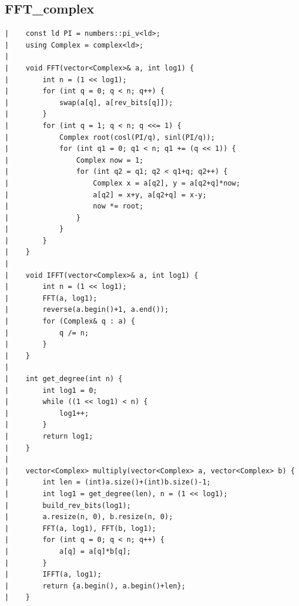 \documentclass[a4paper, 10pt]{article}
\begin{document}
\begin{center}
\section*{FFT\_complex}
\begin{verbatim}
|    const ld PI = numbers::pi_v<ld>;
|    using Complex = complex<ld>;
|    
|    void FFT(vector<Complex>& a, int log1) {
|        int n = (1 << log1);
|        for (int q = 0; q < n; q++) {
|            swap(a[q], a[rev_bits[q]]);
|        }
|        for (int q = 1; q < n; q <<= 1) {
|            Complex root(cosl(PI/q), sinl(PI/q));
|            for (int q1 = 0; q1 < n; q1 += (q << 1)) {
|                Complex now = 1;
|                for (int q2 = q1; q2 < q1+q; q2++) {
|                    Complex x = a[q2], y = a[q2+q]*now;
|                    a[q2] = x+y, a[q2+q] = x-y;
|                    now *= root;
|                }
|            }
|        }
|    }
|    
|    void IFFT(vector<Complex>& a, int log1) {
|        int n = (1 << log1);
|        FFT(a, log1);
|        reverse(a.begin()+1, a.end());
|        for (Complex& q : a) {
|            q /= n;
|        }
|    }
|    
|    int get_degree(int n) {
|        int log1 = 0;
|        while ((1 << log1) < n) {
|            log1++;
|        }
|        return log1;
|    }
|    
|    vector<Complex> multiply(vector<Complex> a, vector<Complex> b) {
|        int len = (int)a.size()+(int)b.size()-1;
|        int log1 = get_degree(len), n = (1 << log1);
|        build_rev_bits(log1);
|        a.resize(n, 0), b.resize(n, 0);
|        FFT(a, log1), FFT(b, log1);
|        for (int q = 0; q < n; q++) {
|            a[q] = a[q]*b[q];
|        }
|        IFFT(a, log1);
|        return {a.begin(), a.begin()+len};
|    }
\end{verbatim}


\end{center}
\end{document}
